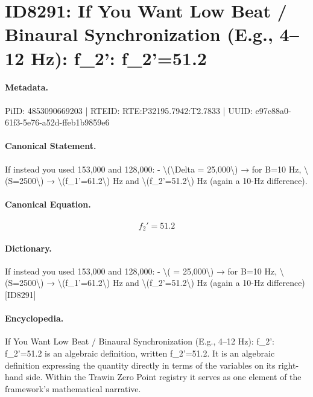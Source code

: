 \section*{ID8291: If You Want Low Beat / Binaural Synchronization (E.g., 4–12 Hz): f\_2': f\_2'=51.2}
\paragraph{Metadata.}
PiID: 4853090669203 | RTEID: RTE:P32195.7942:T2.7833 | UUID: e97c88a0-61f3-5e76-a52d-ffeb1b9859e6

\paragraph{Canonical Statement.}
If instead you used 153,000 and 128,000: - \textbackslash{}(\textbackslash{}Delta = 25,000\textbackslash{}) → for B=10 Hz, \textbackslash{}(S=2500\textbackslash{}) → \textbackslash{}(f\_1'=61.2\textbackslash{}) Hz and \textbackslash{}(f\_2'=51.2\textbackslash{}) Hz (again a 10-Hz difference).

\paragraph{Canonical Equation.}
\[
f_2'=51.2
\]

\paragraph{Dictionary.}
If instead you used 153,000 and 128,000: - \textbackslash{}( = 25,000\textbackslash{}) → for B=10 Hz, \textbackslash{}(S=2500\textbackslash{}) → \textbackslash{}(f\_1'=61.2\textbackslash{}) Hz and \textbackslash{}(f\_2'=51.2\textbackslash{}) Hz (again a 10-Hz difference) [ID8291]

\paragraph{Encyclopedia.}
If You Want Low Beat / Binaural Synchronization (E.g., 4–12 Hz): f\_2': f\_2'=51.2 is an algebraic definition, written f\_2'=51.2. It is an algebraic definition expressing the quantity directly in terms of the variables on its right-hand side. Within the Trawin Zero Point registry it serves as one element of the framework's mathematical narrative.
